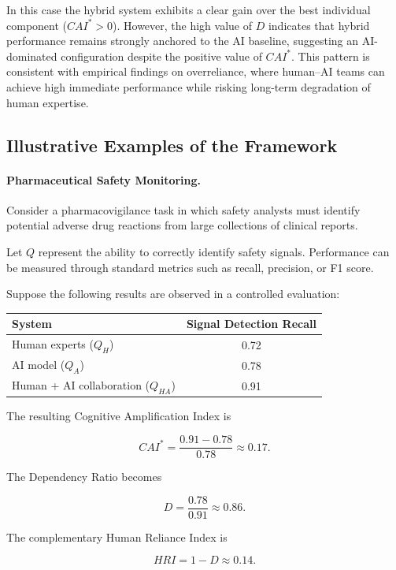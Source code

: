 \documentclass[11pt]{article}
\begin{document}
In this case the hybrid system exhibits a clear gain over the
best individual component ($CAI^* > 0$).
However, the high value of $D$ indicates that hybrid performance
remains strongly anchored to the AI baseline, suggesting an
AI-dominated configuration despite the positive value of $CAI^*$.
This pattern is consistent with empirical findings on overreliance,
where human--AI teams can achieve high immediate performance while
risking long-term degradation of human expertise.\cite{overreliance-ai,humans-inherit-ai-bias}

\subsection{Illustrative Examples of the Framework}

\paragraph{Pharmaceutical Safety Monitoring.}
Consider a pharmacovigilance task in which safety analysts must identify
potential adverse drug reactions from large collections of clinical reports.

Let $Q$ represent the ability to correctly identify safety signals.
Performance can be measured through standard metrics such as recall,
precision, or F1 score.

Suppose the following results are observed in a controlled evaluation:

\begin{center}
\begin{tabular}{lc}
\toprule
System & Signal Detection Recall \\
\midrule
Human experts ($Q_H$) & 0.72 \\
AI model ($Q_A$) & 0.78 \\
Human + AI collaboration ($Q_{HA}$) & 0.91 \\
\bottomrule
\end{tabular}
\end{center}

The resulting Cognitive Amplification Index is

\[
CAI^* = \frac{0.91 - 0.78}{0.78} \approx 0.17.
\]

The Dependency Ratio becomes

\[
D = \frac{0.78}{0.91} \approx 0.86.
\]

The complementary Human Reliance Index is

\[
HRI = 1 - D \approx 0.14.
\]
\end{document}
